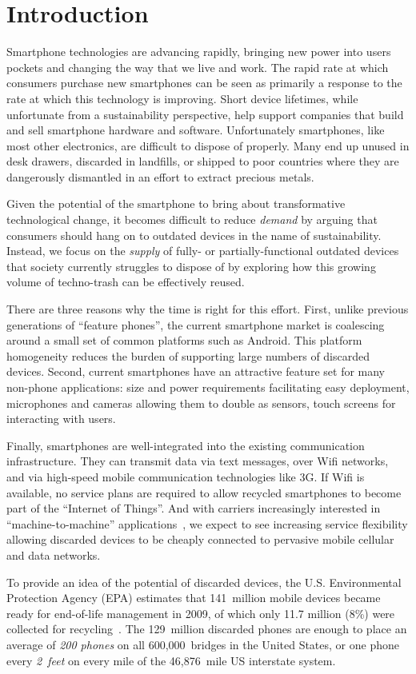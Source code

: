 \section{Introduction}

Smartphone technologies are advancing rapidly, bringing new power into users
pockets and changing the way that we live and work. The rapid rate at which
consumers purchase new smartphones can be seen as primarily a response to the
rate at which this technology is improving. Short device lifetimes, while
unfortunate from a sustainability perspective, help support companies that
build and sell smartphone hardware and software. Unfortunately smartphones,
like most other electronics, are difficult to dispose of properly. Many end
up unused in desk drawers, discarded in landfills, or shipped to poor
countries where they are dangerously dismantled in an effort to extract
precious metals.

Given the potential of the smartphone to bring about transformative
technological change, it becomes difficult to reduce \textit{demand} by
arguing that consumers should hang on to outdated devices in the name of
sustainability. Instead, we focus on the \textit{supply} of fully- or
partially-functional outdated devices that society currently struggles to
dispose of by exploring how this growing volume of techno-trash can be
effectively reused.

There are three reasons why the time is right for this effort. First, unlike
previous generations of ``feature phones'', the current smartphone market is
coalescing around a small set of common platforms such as Android. This
platform homogeneity reduces the burden of supporting large numbers of
discarded devices. Second, current smartphones have an attractive feature set
for many non-phone applications: size and power requirements facilitating
easy deployment, microphones and cameras allowing them to double as sensors,
touch screens for interacting with users.

Finally, smartphones are well-integrated into the existing communication
infrastructure. They can transmit data via text messages, over Wifi networks,
and via high-speed mobile communication technologies like 3G. If Wifi is
available, no service plans are required to allow recycled smartphones to
become part of the ``Internet of Things''. And with carriers increasingly
interested in ``machine-to-machine'' applications~\cite{FIXME-m2m}, we expect
to see increasing service flexibility allowing discarded devices to be
cheaply connected to pervasive mobile cellular and data networks.

To provide an idea of the potential of discarded devices, the U.S.
Environmental Protection Agency (EPA) estimates that 141~million mobile
devices became ready for end-of-life management in 2009, of which only 11.7
million (8\%) were collected for recycling~\cite{epa-ewasteweb}. The
129~million discarded phones are enough to place an average of \textit{200
phones} on all 600,000~bridges in the United States, or one phone every
\textit{2~feet} on every mile of the 46,876~mile US interstate system.

